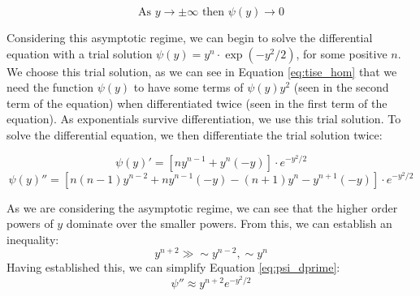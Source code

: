 \documentclass[a4paper]{article}
\begin{document}
\begin{equation}
\text{As }y\rightarrow\pm\infty \text{ then } \psi(y)\rightarrow 0
\end{equation}

Considering this asymptotic regime, we can begin to solve the differential equation with a trial solution $\psi(y)=y^n\cdot\exp(-y^2/2)$, for some positive $n$. We choose this trial solution, as we can see in Equation \ref{eq:tise_hom} that we need the function $\psi(y)$ to have some terms of $\psi(y)y^2$ (seen in the second term of the equation) when differentiated twice (seen in the first term of the equation). As exponentials survive differentiation, we use this trial solution. To solve the differential equation, we then differentiate the trial solution twice:

\begin{equation} \label{eq:psi_prime}
\psi(y)'= [ny^{n-1}+y^n(-y)]\cdot e^{-y^2/2}
\end{equation}
\begin{equation} \label{eq:psi_dprime}
\psi(y)''=[n(n-1)y^{n-2}+ny^{n-1}(-y)-(n+1)y^n-y^{n+1}(-y)]\cdot e^{-y^2/2}
\end{equation}

As we are considering the asymptotic regime, we can see that the higher order powers of $y$ dominate over the smaller powers. From this, we can establish an inequality:
\begin{equation}
y^{n+2}\gg\sim y^{n-2}, \sim y^n
\end{equation}
Having established this, we can simplify Equation \ref{eq:psi_dprime}:
\begin{equation}
\psi''\approx y^{n+2}e^{-y^2/2}
\end{equation}
\end{document}
